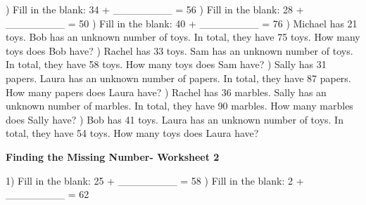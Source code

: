 \documentclass{article}%
\begin{document}
\newline%
\newline%
) Fill in the blank: 34 + \_\_\_\_\_\_\_\_ = 56%
\newline%
\newline%
) Fill in the blank: 28 + \_\_\_\_\_\_\_\_ = 50%
\newline%
\newline%
) Fill in the blank: 40 + \_\_\_\_\_\_\_\_ = 76%
\newline%
\newline%
) Michael has 21 toys. Bob has an unknown number of toys. In total, they have 75 toys. How many toys does Bob have?%
\newline%
\newline%
) Rachel has 33 toys. Sam has an unknown number of toys. In total, they have 58 toys. How many toys does Sam have?%
\newline%
\newline%
) Sally has 31 papers. Laura has an unknown number of papers. In total, they have 87 papers. How many papers does Laura have?%
\newline%
\newline%
) Rachel has 36 marbles. Sally has an unknown number of marbles. In total, they have 90 marbles. How many marbles does Sally have?%
\newline%
\newline%
) Bob has 41 toys. Laura has an unknown number of toys. In total, they have 54 toys. How many toys does Laura have?%
\newline%
\newline%
\newline%
\pagebreak%
\large%
\begin{center}%
\textbf{Finding the Missing Number- Worksheet 2}%
\newline%
\end{center} \normalsize%
1) Fill in the blank: 25 + \_\_\_\_\_\_\_\_ = 58%
\newline%
\newline%
) Fill in the blank: 2 + \_\_\_\_\_\_\_\_ = 62%
\end{document}
